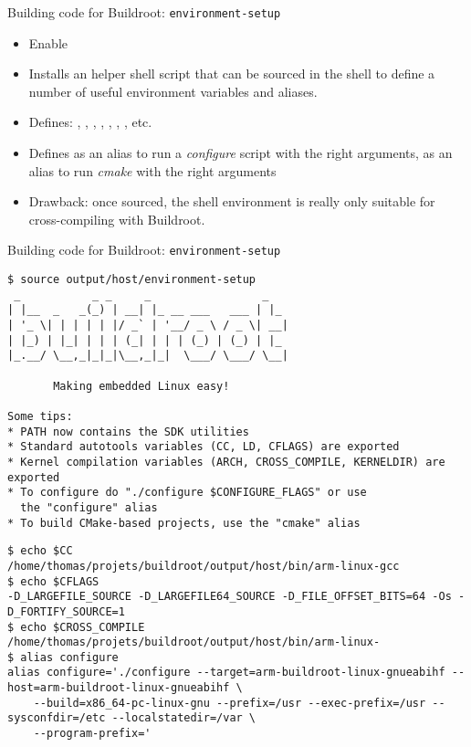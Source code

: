 \begin{frame}[fragile]{Building code for Buildroot: {\tt environment-setup}}
  \begin{itemize}
  \item Enable 
  \item Installs an helper shell script
     that can be sourced in the
    shell to define a number of useful environment variables and
    aliases.
  \item Defines: , , , ,
    , , , etc.
  \item Defines  as an alias to run a {\em configure}
    script with the right arguments,  as an alias to run
    {\em cmake} with the right arguments
  \item Drawback: once sourced, the shell environment is really only
    suitable for cross-compiling with Buildroot.
  \end{itemize}
\end{frame}

\begin{frame}[fragile]{Building code for Buildroot: {\tt environment-setup}}
  \begin{block}{}
  {\tiny
\begin{verbatim}
$ source output/host/environment-setup 
 _           _ _     _                 _
| |__  _   _(_) | __| |_ __ ___   ___ | |_
| '_ \| | | | | |/ _` | '__/ _ \ / _ \| __|
| |_) | |_| | | | (_| | | | (_) | (_) | |_
|_.__/ \__,_|_|_|\__,_|_|  \___/ \___/ \__|

       Making embedded Linux easy!

Some tips:
* PATH now contains the SDK utilities
* Standard autotools variables (CC, LD, CFLAGS) are exported
* Kernel compilation variables (ARCH, CROSS_COMPILE, KERNELDIR) are exported
* To configure do "./configure $CONFIGURE_FLAGS" or use
  the "configure" alias
* To build CMake-based projects, use the "cmake" alias
\end{verbatim}
  }
\end{block}

  \begin{block}{}
  {\tiny
\begin{verbatim}
$ echo $CC
/home/thomas/projets/buildroot/output/host/bin/arm-linux-gcc
$ echo $CFLAGS
-D_LARGEFILE_SOURCE -D_LARGEFILE64_SOURCE -D_FILE_OFFSET_BITS=64 -Os -D_FORTIFY_SOURCE=1
$ echo $CROSS_COMPILE 
/home/thomas/projets/buildroot/output/host/bin/arm-linux-
$ alias configure
alias configure='./configure --target=arm-buildroot-linux-gnueabihf --host=arm-buildroot-linux-gnueabihf \
    --build=x86_64-pc-linux-gnu --prefix=/usr --exec-prefix=/usr --sysconfdir=/etc --localstatedir=/var \
    --program-prefix='
\end{verbatim}
  }
\end{block}

\end{frame}

